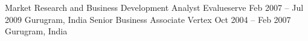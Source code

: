 \documentclass[a4paper,]{fortysecondscv}
\begin{document}
\begin{cvtable}
    \vspace{\topsep}
    \cvitemoneblock
    {Market Research and Business Development Analyst}
    {Evalueserve}
    {Feb 2007 -- Jul 2009}
    {Gurugram, India}
    {
    }
    \vspace{\topsep}
    \cvitemoneblock
    {Senior Business Associate}
    {Vertex}
    {Oct 2004 -- Feb 2007}
    {Gurugram, India}
    {
    }
\end{cvtable}





\newpage
\makebacksidebar





\end{document}
